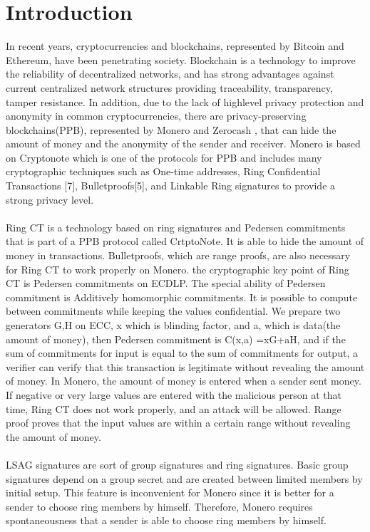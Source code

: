 \documentclass[letterpaper,10pt]{article}
\begin{document}
\section{Introduction}
In recent years, cryptocurrencies and blockchains, represented by Bitcoin and Ethereum, have been penetrating society. Blockchain is a technology to improve the reliability of decentralized networks, and has strong advantages against current centralized network structures providing traceability, transparency, tamper resistance.
In addition, due to the lack of highlevel privacy protection and anonymity in common cryptocurrencies, there are privacy-preserving blockchains(PPB), represented by Monero and Zerocash , that can hide the amount of money and the anonymity of the sender and receiver.
Monero is based on Cryptonote which is one of the protocols for PPB and includes many cryptographic techniques such as One-time addresses, Ring Confidential Transactions [7], Bulletproofs[5], and Linkable Ring signatures to provide a strong privacy level.\\
\\
Ring CT is a technology based on ring signatures and Pedersen commitments
that is part of a PPB protocol called CrtptoNote. It is able to hide the
amount of money in transactions. Bulletproofs, which are range proofs, are
also necessary for Ring CT to work properly on Monero. the cryptographic key
point of Ring CT is Pedersen commitments on ECDLP. The special ability of
Pedersen commitment is Additively homomorphic commitments. It is possible
to compute between commitments while keeping the values confidential. We
prepare two generators G,H on ECC, x which is blinding factor, and a, which
is data(the amount of money), then Pedersen commitment is C(x,a) =xG+aH,
and if the sum of commitments for input is equal to the sum of commitments
for output, a verifier can verify that this transaction is legitimate without revealing
the amount of money. In Monero, the amount of money is entered
when a sender sent money. If negative or very large values are entered with
the malicious person at that time, Ring CT does not work properly, and an
attack will be allowed. Range proof proves that the input values are within a
certain range without revealing the amount of money.\\
\\
LSAG signatures are sort of group signatures and ring signatures. Basic
group signatures depend on a group secret and are created between limited
members by initial setup. This feature is inconvenient for Monero since it is
better for a sender to choose ring members by himself. Therefore, Monero
requires spontaneousness that a sender is able to choose ring members by
himself.
\end{document}
